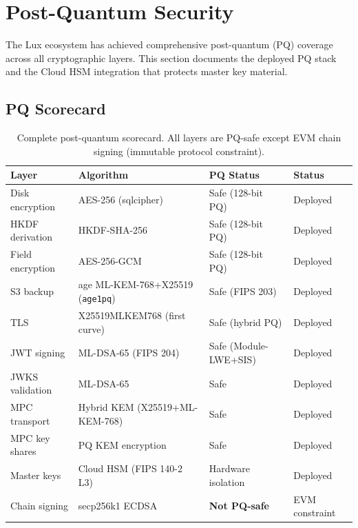 \documentclass[11pt,a4paper]{article}
\begin{document}
\section{Post-Quantum Security}\label{sec:pq}

The Lux ecosystem has achieved comprehensive post-quantum (PQ)
coverage across all cryptographic layers. This section documents the
deployed PQ stack and the Cloud HSM integration that protects master
key material.

\subsection{PQ Scorecard}

\begin{table}[H]
\centering
\caption{Complete post-quantum scorecard. All layers are PQ-safe
  except EVM chain signing (immutable protocol constraint).}
\label{tab:pq-scorecard}
\begin{tabular}{@{}llll@{}}
\toprule
\textbf{Layer} & \textbf{Algorithm} & \textbf{PQ Status} & \textbf{Status} \\
\midrule
Disk encryption     & AES-256 (sqlcipher)          & Safe (128-bit PQ)    & Deployed \\
HKDF derivation     & HKDF-SHA-256                 & Safe (128-bit PQ)    & Deployed \\
Field encryption    & AES-256-GCM                  & Safe (128-bit PQ)    & Deployed \\
S3 backup           & age ML-KEM-768+X25519 (\texttt{age1pq}) & Safe (FIPS 203) & Deployed \\
TLS                 & X25519MLKEM768 (first curve) & Safe (hybrid PQ)     & Deployed \\
JWT signing         & ML-DSA-65 (FIPS 204)         & Safe (Module-LWE+SIS)& Deployed \\
JWKS validation     & ML-DSA-65                    & Safe                 & Deployed \\
MPC transport       & Hybrid KEM (X25519+ML-KEM-768) & Safe              & Deployed \\
MPC key shares      & PQ KEM encryption            & Safe                 & Deployed \\
Master keys         & Cloud HSM (FIPS 140-2 L3)    & Hardware isolation   & Deployed \\
Chain signing       & secp256k1 ECDSA              & \textbf{Not PQ-safe} & EVM constraint \\
\bottomrule
\end{tabular}
\end{table}
\end{document}
